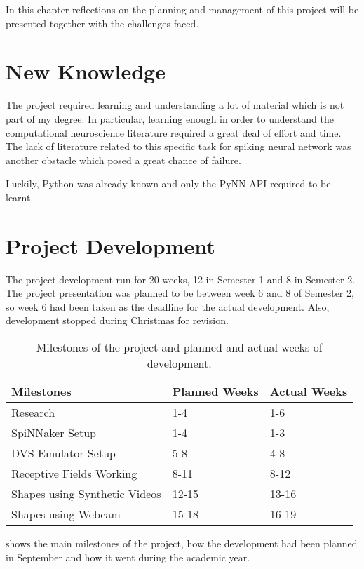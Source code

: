 In this chapter reflections on the planning and management of this project will be presented together with the challenges faced. 

\section{New Knowledge}
The project required learning and understanding a lot of material which is not part of my degree. In particular, learning enough in order to understand the computational neuroscience literature required a great deal of effort and time. The lack of literature related to this specific task for spiking neural network was another obstacle which posed a great chance of failure. 

Luckily, Python was already known and only the PyNN API required to be learnt. 

\section{Project Development}
The project development run for 20 weeks, 12 in Semester 1 and 8 in Semester 2. The project presentation was planned to be between week 6 and 8 of Semester 2, so week 6 had been taken as the deadline for the actual development. Also, development stopped during Christmas for revision.

\begin{table}[ht]
\centering
\begin{tabular}{l|ll}
Milestones                    & Planned Weeks & Actual Weeks \\ \hline
Research                      & 1-4           & 1-6          \\
SpiNNaker Setup               & 1-4           & 1-3          \\
DVS Emulator Setup            & 5-8           & 4-8          \\
Receptive Fields Working      & 8-11          & 8-12         \\
Shapes using Synthetic Videos & 12-15         & 13-16        \\
Shapes using Webcam           & 15-18         & 16-19       
\end{tabular}
\caption{Milestones of the project and planned and actual weeks of development.}
\label{table:development}
\end{table}

 shows the main milestones of the project, how the development had been planned in September and how it went during the academic year.

